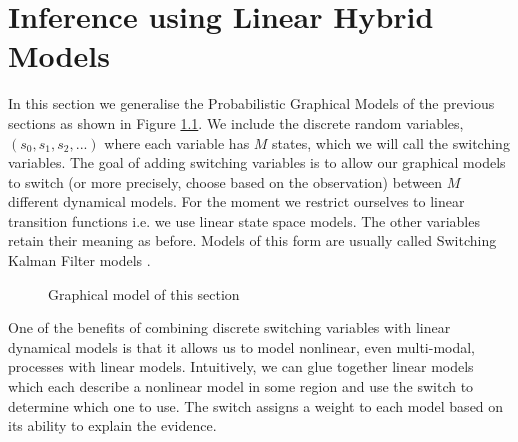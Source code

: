 \chapter{Inference using Linear Hybrid Models}
In this section we generalise the Probabilistic Graphical Models of the previous sections as shown in Figure \ref{fig_hybridmod1}. We include the discrete random variables, $(s_0,s_1, s_2,...)$ where each variable has $M$ states, which we will call the switching variables. The goal of adding switching variables is to allow our graphical models to switch (or more precisely, choose based on the observation) between $M$ different dynamical models. For the moment we restrict ourselves to linear transition functions i.e. we use linear state space models. The other variables retain their meaning as before. Models of this form are usually called Switching Kalman Filter models \cite{murphy1}. 
\begin{figure}[H] 
\centering
{}
\caption{Graphical model of this section}
\label{fig_hybridmod1}
\end{figure}
One of the benefits of combining discrete switching variables with linear dynamical models is that it allows us to model nonlinear, even multi-modal, processes with linear models. Intuitively, we can glue together linear models which each describe a nonlinear model in some region and use the switch to determine which one to use. The switch assigns a weight to each model based on its ability to explain the evidence. 

